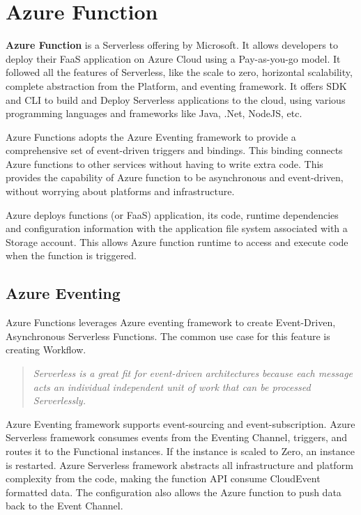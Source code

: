\documentclass[12pt]{article}
\begin{document}
\section{Azure Function}
\begin{flushleft}
\textbf{Azure Function} is a Serverless offering by Microsoft. It allows developers to deploy their FaaS application on Azure Cloud using a Pay-as-you-go model. It followed all the features of Serverless, like the scale to zero, horizontal scalability, complete abstraction from the Platform, and eventing framework. It offers SDK and CLI to build and Deploy Serverless applications to the cloud, using various programming languages and frameworks like Java, .Net, NodeJS, etc.

Azure Functions adopts the Azure Eventing framework to provide a comprehensive set of event-driven triggers and bindings. This binding connects Azure functions to other services without having to write extra code. This provides the capability of Azure function to be asynchronous and event-driven, without worrying about platforms and infrastructure.

Azure deploys functions (or FaaS) application, its code, runtime dependencies and configuration information with the application file system associated with a Storage account. This allows Azure function runtime to access and execute code when the function is triggered. 

\subsection{Azure Eventing}
Azure Functions leverages Azure eventing framework to create Event-Driven, Asynchronous Serverless Functions. The common use case for this feature is creating Workflow. 
\begin{quote}
    \textit{Serverless is a great fit for event-driven architectures because each message acts an individual independent unit of work that can be processed Serverlessly.} \cite{ANDERSON_2024}
\end{quote}

Azure Eventing framework supports event-sourcing and event-subscription. Azure Serverless framework consumes events from the Eventing Channel, triggers, and routes it to the Functional instances. If the instance is scaled to Zero, an instance is restarted. Azure Serverless framework abstracts all infrastructure and platform complexity from the code, making the function API consume CloudEvent formatted data. The configuration also allows the Azure function to push data back to the Event Channel.


\end{flushleft}
\end{document}
